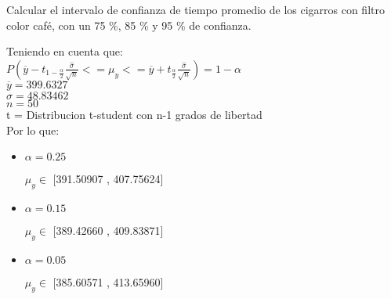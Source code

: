 Calcular el intervalo de confianza de tiempo promedio de los cigarros con filtro color caf\'e, con un 75 \%,
85 \% y 95 \% de confianza.

Teniendo en cuenta que: \\

$P(\overline{y} - t_{1-\frac{\alpha}{2}}\frac{\widehat{\sigma}}{\sqrt{n}} <= \mu_y <= \overline{y} + t_{\frac{\alpha}{2}}\frac{\widehat{\sigma}}{\sqrt{n}}) = 1 - \alpha$\\
$\overline{y} = 399.6327$\\
$\widehat{\sigma} = 48.83462$\\
$n = 50$\\
t = Distribucion t-student con n-1 grados de libertad\\

Por lo que: \\

\begin{itemize}

\item $\alpha = 0.25$

$\mu_y \in$ [391.50907 , 407.75624]

\item $\alpha = 0.15$

$\mu_y \in$ [389.42660 , 409.83871]

\item $\alpha = 0.05$

$\mu_y \in$ [385.60571 , 413.65960]

\end{itemize}
